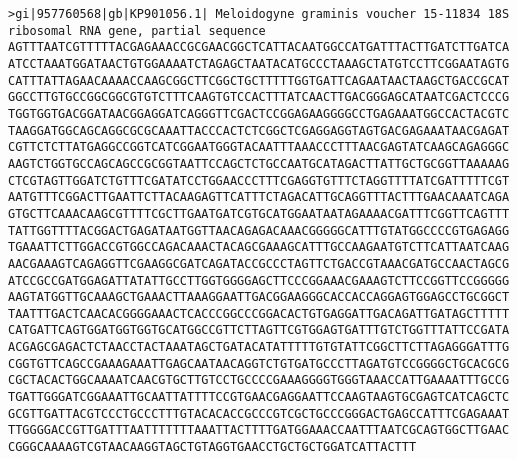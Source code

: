\documentclass[11pt]{article}
\begin{document}
\begin{Verbatim}[commandchars=\\\{\}]
>gi|957760568|gb|KP901056.1| Meloidogyne graminis voucher 15-11834 18S ribosomal RNA gene, partial sequence
AGTTTAATCGTTTTTACGAGAAACCGCGAACGGCTCATTACAATGGCCATGATTTACTTGATCTTGATCA
ATCCTAAATGGATAACTGTGGAAAATCTAGAGCTAATACATGCCCTAAAGCTATGTCCTTCGGAATAGTG
CATTTATTAGAACAAAACCAAGCGGCTTCGGCTGCTTTTTGGTGATTCAGAATAACTAAGCTGACCGCAT
GGCCTTGTGCCGGCGGCGTGTCTTTCAAGTGTCCACTTTATCAACTTGACGGGAGCATAATCGACTCCCG
TGGTGGTGACGGATAACGGAGGATCAGGGTTCGACTCCGGAGAAGGGGCCTGAGAAATGGCCACTACGTC
TAAGGATGGCAGCAGGCGCGCAAATTACCCACTCTCGGCTCGAGGAGGTAGTGACGAGAAATAACGAGAT
CGTTCTCTTATGAGGCCGGTCATCGGAATGGGTACAATTTAAACCCTTTAACGAGTATCAAGCAGAGGGC
AAGTCTGGTGCCAGCAGCCGCGGTAATTCCAGCTCTGCCAATGCATAGACTTATTGCTGCGGTTAAAAAG
CTCGTAGTTGGATCTGTTTCGATATCCTGGAACCCTTTCGAGGTGTTTCTAGGTTTTATCGATTTTTCGT
AATGTTTCGGACTTGAATTCTTACAAGAGTTCATTTCTAGACATTGCAGGTTTACTTTGAACAAATCAGA
GTGCTTCAAACAAGCGTTTTCGCTTGAATGATCGTGCATGGAATAATAGAAAACGATTTCGGTTCAGTTT
TATTGGTTTTACGGACTGAGATAATGGTTAACAGAGACAAACGGGGGCATTTGTATGGCCCCGTGAGAGG
TGAAATTCTTGGACCGTGGCCAGACAAACTACAGCGAAAGCATTTGCCAAGAATGTCTTCATTAATCAAG
AACGAAAGTCAGAGGTTCGAAGGCGATCAGATACCGCCCTAGTTCTGACCGTAAACGATGCCAACTAGCG
ATCCGCCGATGGAGATTATATTGCCTTGGTGGGGAGCTTCCCGGAAACGAAAGTCTTCCGGTTCCGGGGG
AAGTATGGTTGCAAAGCTGAAACTTAAAGGAATTGACGGAAGGGCACCACCAGGAGTGGAGCCTGCGGCT
TAATTTGACTCAACACGGGGAAACTCACCCGGCCCGGACACTGTGAGGATTGACAGATTGATAGCTTTTT
CATGATTCAGTGGATGGTGGTGCATGGCCGTTCTTAGTTCGTGGAGTGATTTGTCTGGTTTATTCCGATA
ACGAGCGAGACTCTAACCTACTAAATAGCTGATACATATTTTTGTGTATTCGGCTTCTTAGAGGGATTTG
CGGTGTTCAGCCGAAAGAAATTGAGCAATAACAGGTCTGTGATGCCCTTAGATGTCCGGGGCTGCACGCG
CGCTACACTGGCAAAATCAACGTGCTTGTCCTGCCCCGAAAGGGGTGGGTAAACCATTGAAAATTTGCCG
TGATTGGGATCGGAAATTGCAATTATTTTCCGTGAACGAGGAATTCCAAGTAAGTGCGAGTCATCAGCTC
GCGTTGATTACGTCCCTGCCCTTTGTACACACCGCCCGTCGCTGCCCGGGACTGAGCCATTTCGAGAAAT
TTGGGGACCGTTGATTTAATTTTTTTAAATTACTTTTGATGGAAACCAATTTAATCGCAGTGGCTTGAAC
CGGGCAAAAGTCGTAACAAGGTAGCTGTAGGTGAACCTGCTGCTGGATCATTACTTT


\end{Verbatim}
\end{document}
